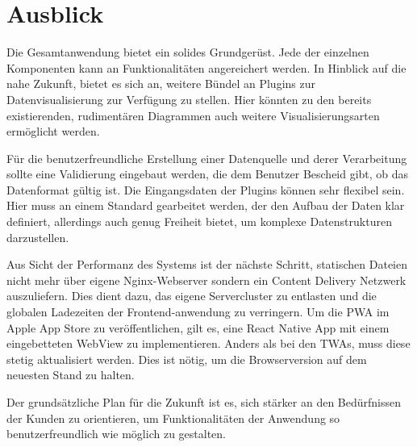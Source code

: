 \chapter{Ausblick}
\label{chap:ausblick}

Die Gesamtanwendung bietet ein solides Grundgerüst. Jede der einzelnen Komponenten
kann an Funktionalitäten angereichert werden. In Hinblick auf die nahe Zukunft, bietet es sich an,
weitere Bündel an Plugins zur Datenvisualisierung zur Verfügung zu stellen. Hier könnten
zu den bereits existierenden, rudimentären Diagrammen auch weitere Visualisierungsarten ermöglicht
werden.

Für die benutzerfreundliche Erstellung einer Datenquelle und derer Verarbeitung
sollte eine Validierung eingebaut werden, die dem Benutzer Bescheid gibt, ob das Datenformat
gültig ist. Die Eingangsdaten der Plugins können sehr flexibel sein. Hier muss an einem Standard
gearbeitet werden, der den Aufbau der Daten klar definiert, allerdings auch genug Freiheit bietet,
um komplexe Datenstrukturen darzustellen.

Aus Sicht der Performanz des Systems ist der nächste
Schritt, statischen Dateien nicht mehr über eigene Nginx-Webserver sondern ein
Content Delivery Netzwerk auszuliefern. Dies dient dazu, das eigene Servercluster
zu entlasten und die globalen Ladezeiten der Frontend-anwendung zu verringern.
Um die PWA im Apple App Store zu veröffentlichen, gilt es, eine React Native
App mit einem eingebetteten WebView zu implementieren. Anders als bei den TWAs, muss
diese stetig aktualisiert werden. Dies ist nötig, um die Browserversion auf
dem neuesten Stand zu halten.

Der grundsätzliche Plan für die Zukunft ist es, sich stärker an den
Bedürfnissen der Kunden zu orientieren, um Funktionalitäten der Anwendung
so benutzerfreundlich wie möglich zu gestalten.

